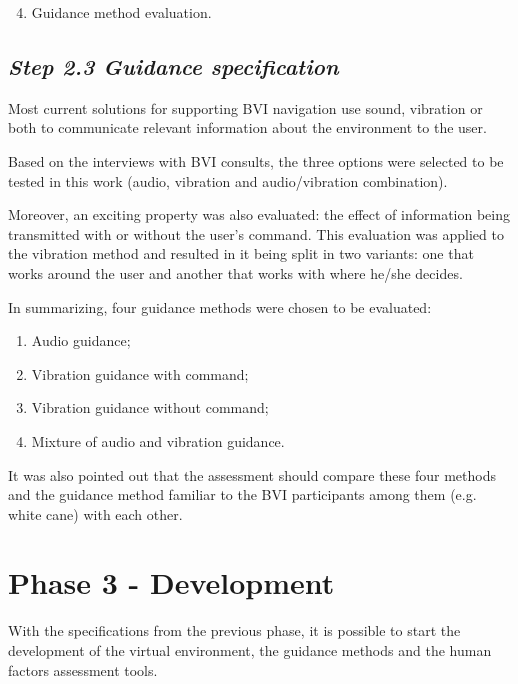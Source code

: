         \begin{enumerate} [label = \Alph*)]
            \setcounter{enumi}{3}
            \item Guidance method evaluation.
        \end{enumerate}

    \subsection*{\textit{Step 2.3 Guidance specification}}
        Most current solutions for supporting BVI navigation use sound, vibration or both to communicate relevant information about the environment to the user. 

        Based on the interviews with BVI consults, the three options were selected to be tested in this work (audio, vibration and audio/vibration combination). 

        Moreover, an exciting property was also evaluated: the effect of information being transmitted with or without the user's command. This evaluation was applied to the vibration method and resulted in it being split in two variants: one that works around the user and another that works with where he/she decides.

        In summarizing, four guidance methods were chosen to be evaluated:
        \begin{enumerate} [label = \Alph*)]
            \item Audio guidance;
            \item Vibration guidance with command;
            \item Vibration guidance without command;
            \item Mixture of audio and vibration guidance.
        \end{enumerate}

        It was also pointed out that the assessment should compare these four methods and the guidance method familiar to the BVI participants among them (e.g. white cane) with each other.
    
    
\section{Phase 3 - Development}
\label{sec:creation_phase}
    
    With the specifications from the previous phase, it is possible to start the development of the virtual environment, the guidance methods and the human factors assessment tools.

